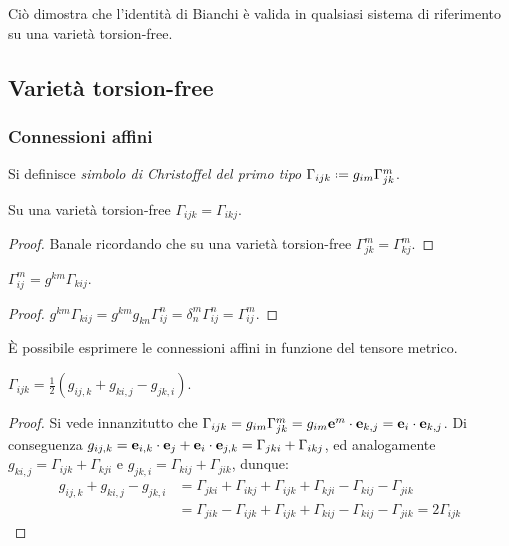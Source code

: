 Ciò dimostra che l'identità di Bianchi è valida in qualsiasi sistema di riferimento su una varietà torsion-free.

\subsection{Varietà torsion-free}

\subsubsection{Connessioni affini}

\begin{definition}
	Si definisce \textit{simbolo di Christoffel del primo tipo} $ \Gamma_{ijk} \defeq g_{im} \Gamma^m_{jk} $.
\end{definition}

\begin{proposition}
	Su una varietà torsion-free $ \Gamma_{ijk} = \Gamma_{ikj} $.
\end{proposition}
\begin{proof}
	Banale ricordando che su una varietà torsion-free $ \Gamma^m_{jk} = \Gamma^m_{kj} $.
\end{proof}

\begin{proposition}\label{chri-1-2}
	$ \Gamma^m_{ij} = g^{km} \Gamma_{kij} $.
\end{proposition}
\begin{proof}
	$ g^{km} \Gamma_{kij} = g^{km} g_{kn} \Gamma^n_{ij} = \delta^m_n \Gamma^n_{ij} = \Gamma^m_{ij} $.
\end{proof}

È possibile esprimere le connessioni affini in funzione del tensore metrico.

\begin{proposition}\label{chri-1}
	$ \Gamma_{ijk} = \frac{1}{2} \left( g_{ij,k} + g_{ki,j} - g_{jk,i} \right) $.
\end{proposition}
\begin{proof}
	Si vede innanzitutto che $ \Gamma_{ijk} = g_{im} \Gamma^m_{jk} = g_{im} \mathbf{e}^m \cdot \mathbf{e}_{k,j} = \mathbf{e}_i \cdot \mathbf{e}_{k,j} $. Di conseguenza $ g_{ij,k} = \mathbf{e}_{i,k} \cdot \mathbf{e}_j + \mathbf{e}_i \cdot \mathbf{e}_{j,k} = \Gamma_{jki} + \Gamma_{ikj} $, ed analogamente $ g_{ki,j} = \Gamma_{ijk} + \Gamma_{kji} $ e $ g_{jk,i} = \Gamma_{kij} + \Gamma_{jik} $, dunque:
	\begin{equation*}
		\begin{split}
			g_{ij,k} + g_{ki,j} - g_{jk,i}
			&= \Gamma_{jki} + \Gamma_{ikj} + \Gamma_{ijk} + \Gamma_{kji} - \Gamma_{kij} - \Gamma_{jik}\\
			&= \Gamma_{jik} - \Gamma_{ijk} + \Gamma_{ijk} + \Gamma_{kij} - \Gamma_{kij} - \Gamma_{jik} = 2 \Gamma_{ijk}
		\end{split}
	\end{equation*}
\end{proof}

